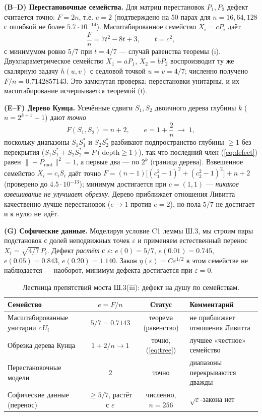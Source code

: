 \documentclass[11pt,a4paper]{article}
\begin{document}
\textbf{(B--D) Перестановочные семейства.} Для матриц перестановок $P_1, P_2$
дефект считается точно: $F = 2n$, т.е. $e = 2$ (подтверждено на $50$ парах для
$n = 16, 64, 128$ с ошибкой не более $5.7\cdot10^{-14}$). Масштабированное
семейство $X_i = cP_i$ даёт
\begin{equation}\label{eq:scaled}
\frac{F}{n} = 7t^2 - 8t + 3, \qquad t = c^2,
\end{equation}
с минимумом ровно $5/7$ при $t = 4/7$ --- случай равенства теоремы (i).
Двухпараметрическое семейство $X_1 = aP_1$, $X_2 = bP_2$ воспроизводит ту же
скалярную задачу $h(u,v)$ с седловой точкой $u = v = 4/7$; численно получено
$F/n = 0.7142857143$. Это замкнутая проверка: перестановки унитарны, и их
масштабирование исчерпывается теоремой (i).

\textbf{(E--F) Дерево Кунца.} Усечённые сдвиги $S_1, S_2$ двоичного дерева
глубины $k$ ($n = 2^{k+1}-1$) дают \emph{точно}
\begin{equation}\label{eq:tree}
F(S_1, S_2) = n + 2, \qquad e = 1 + \frac{2}{n} \;\to\; 1,
\end{equation}
поскольку диапазоны $S_1S_1^*$ и $S_2S_2^*$ разбивают подпространство глубины
$\ge 1$ без перекрытия ($S_1S_1^* + S_2S_2^* = P(\text{depth} \ge 1)$), так что
последний член (\ref{eq:defect}) равен $\|-P_{\mathrm{root}}\|^2 = 1$, а первые
два --- по $2^k$ (граница дерева). Взвешенное семейство $X_i = c_iS_i$ даёт
точно $F = (n-1)\big[(c_1^2-1)^2 + (c_2^2-1)^2\big] + n + 2$ (проверено до
$4.5\cdot10^{-13}$); минимум достигается при $c = (1,1)$ --- \emph{никакое
взвешивание не улучшает обрезку}. Дерево приближает отношения Ливитта
качественно лучше перестановок ($e \to 1$ против $e = 2$), но пола $5/7$ не
достигает и к нулю не идёт.

\textbf{(G) Софические данные.} Моделируя условие C1 леммы Ш.3, мы строим пары
подстановок с долей неподвижных точек $\varepsilon$ и применяем естественный
перенос $X_i = \sqrt{4/7}\,P_i$. Дефект \emph{растёт} с $\varepsilon$:
$e(0) = 5/7$, $e(0.01) = 0.745$, $e(0.05) = 0.843$, $e(0.20) = 1.140$. Закон
$\eta(\varepsilon) = C\varepsilon^{1/2}$ в этом семействе не наблюдается ---
наоборот, минимум дефекта достигается при $\varepsilon = 0$.

\begin{table}[htbp]
\centering\small
\caption{Лестница препятствий моста Ш.3(iii): дефект на душу по семействам.}
\label{tab:ladder}
\begin{tabularx}{\textwidth}{lccY}
\toprule
Семейство & $e = F/n$ & Статус & Комментарий \\
\midrule
Масштабированные унитарии $c\,U_i$ & $5/7 = 0.7143$ & теорема (равенство) & не приближает отношения Ливитта \\
Обрезка дерева Кунца & $1 + 2/n \to 1$ & точно, (\ref{eq:tree}) & лучшее «честное» семейство \\
Перестановочные модели & $2$ & точно & диапазоны перекрываются дважды \\
Софические данные (перенос) & $\ge 5/7$, растёт с $\varepsilon$ & численно, $n=256$ & $\sqrt{\varepsilon}$-закона нет \\
\bottomrule
\end{tabularx}
\end{table}
\end{document}
